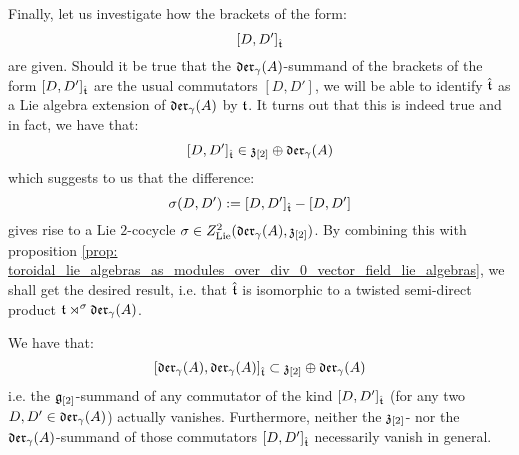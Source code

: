         Finally, let us investigate how the brackets of the form:
            $$[D, D']_{\hat{\mathfrak{t}}}$$
        are given. Should it be true that the $\mathfrak{der}_{\gamma}(A)$-summand of the brackets of the form $[D, D']_{\hat{\mathfrak{t}}}$ are the usual commutators $[D, D']$, we will be able to identify $\hat{\mathfrak{t}}$ as a Lie algebra extension of $\mathfrak{der}_{\gamma}(A)$ by $\mathfrak{t}$. It turns out that this is indeed true and in fact, we have that:
            $$[D, D']_{\hat{\mathfrak{t}}} \in \mathfrak{z}_{[2]} \oplus \mathfrak{der}_{\gamma}(A)$$
        which suggests to us that the difference:
            $$\sigma(D, D') := [D, D']_{\hat{\mathfrak{t}}} - [D, D']$$
        gives rise to a Lie $2$-cocycle $\sigma \in Z^2_{\mathrm{Lie}}(\mathfrak{der}_{\gamma}(A), \mathfrak{z}_{[2]})$. By combining this with proposition \ref{prop: toroidal_lie_algebras_as_modules_over_div_0_vector_field_lie_algebras}, we shall get the desired result, i.e. that $\hat{\mathfrak{t}}$ is isomorphic to a twisted semi-direct product $\mathfrak{t} \rtimes^{\sigma} \mathfrak{der}_{\gamma}(A)$. 
        \begin{proposition} \label{prop: lie_bracket_on_orthogonal_complement_of_toroidal_centre}
            We have that:
                $$[ \mathfrak{der}_{\gamma}(A), \mathfrak{der}_{\gamma}(A) ]_{\hat{\mathfrak{t}}} \subset \mathfrak{z}_{[2]} \oplus \mathfrak{der}_{\gamma}(A)$$
            i.e. the $\mathfrak{g}_{[2]}$-summand of any commutator of the kind $[D, D']_{\hat{\mathfrak{t}}}$ (for any two $D, D' \in \mathfrak{der}_{\gamma}(A)$) actually vanishes. Furthermore, neither the $\mathfrak{z}_{[2]}$- nor the $\mathfrak{der}_{\gamma}(A)$-summand of those commutators $[D, D']_{\hat{\mathfrak{t}}}$ necessarily vanish in general. 
        \end{proposition}
